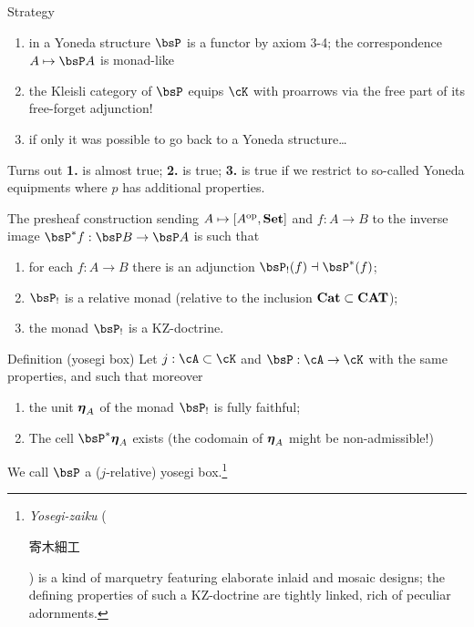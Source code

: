 \documentclass{beamer}
\begin{document}
\begin{frame}
	\begin{block}{Strategy}
		\begin{enumerate}
			\item in a Yoneda structure $\bsP$ is a functor by axiom 3-4; the correspondence $A\mapsto \bsP A$ is \alert{monad-like}
			\item<2-> \alert{the Kleisli category of $\bsP$ equips $\cK$ with proarrows via the free part of its free-forget adjunction!}
			\item<3-> if only it was possible to go back to a Yoneda structure\dots
		\end{enumerate}
	\end{block}
	\bigskip
	Turns out	\textbf{1.} is almost true; \textbf{2.} is true; \textbf{3.} is true if we restrict to so-called \alert{Yoneda equipments} where $p$ has additional properties.
\end{frame}
\begin{frame}
	The presheaf construction sending $A\mapsto [A^{\text{op}},\mathbf{Set}]$ and $f : A\to B$ to the inverse image $\bsP^*f : \bsP B\to \bsP A$ is such that
	\begin{enumerate}
		\item<2-> for each $f : A\to B$ there is an adjunction $\bsP_!(f) \dashv  \bsP^*(f)$;
		\item<3-> $\bsP_!$ is a \alert{relative monad} (relative to the inclusion $\mathbf{Cat} \subset \mathbf{CAT}$);
		\item<4-> the monad $\bsP_!$ is a \alert{KZ-doctrine}.
	\end{enumerate}
\end{frame}
\begin{frame}
	\begin{block}{Definition (yosegi box)}
		Let $j: \cA \subset \cK$ and $\bsP : \cA\to \cK$ with the same properties, and such that moreover
		\begin{enumerate}
			\item the unit $\boldsymbol{\eta}_A$ of the monad $\bsP_!$ is fully faithful;
			\item<2-> The cell $\bsP^*\myeta_A$ exists (the codomain of $\boldsymbol{\eta}_A$ might be non-admissible!)
		\end{enumerate}
				We call $\bsP$ a ($j$-relative) \alert{yosegi box.}\onslide<4->\footnote{\emph{Yosegi-zaiku} (\begin{CJK}{UTF8}{min}寄木細工\end{CJK}) is a kind of marquetry featuring elaborate inlaid and mosaic designs; the defining properties of such a KZ-doctrine are tightly linked, rich of peculiar adornments.}
	\end{block}

\end{frame}
\end{document}
